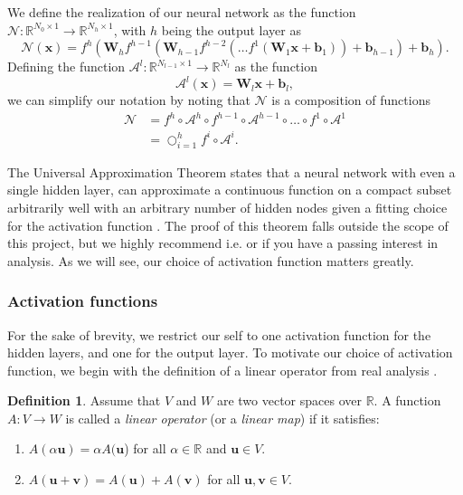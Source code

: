 \documentclass{article}
\theoremstyle{definition}
\newtheorem{definition}{Definition}[subsection]
\begin{document}
We define the realization of our neural network as the function $\mathcal{N}: \mathbb{R}^{N_0 \times 1} \to \mathbb{R}^{N_h \times 1}$, with $h$ being the output layer as
\begin{equation*}
    \mathcal{N}(\boldsymbol{x}) =
    f^h\left(
    \mathbf{W}_h f^{h-1} \left(
    \mathbf{W}_{h-1}f^{h-2} \left(\ldots f^1\left( \mathbf{W}_1 \boldsymbol{x} + \mathbf{b}_1 \right) \right)
    + \mathbf{b}_{h-1} \right) 
    + \mathbf{b}_h \right).
\end{equation*}
Defining the function $\mathcal{A}^l: \mathbb{R}^{N_{l-1} \times 1} \to \mathbb{R}^{N_{l}}$ as the function
\begin{equation*}
    \mathcal{A}^l (\boldsymbol{x}) = \mathbf{W}_l \boldsymbol{x} + \mathbf{b}_l,
\end{equation*}
we can simplify our notation by noting that $\mathcal{N}$ is a composition of functions
\begin{align*}
    \mathcal{N} &= f^h \circ \mathcal{A}^h \circ f^{h-1} \circ \mathcal{A}^{h-1} \circ \ldots \circ f^1 \circ \mathcal{A}^1 \\
    &= \bigcirc_{i = 1}^h f^{i} \circ \mathcal{A}^{i}.
\end{align*}

The Universal Approximation Theorem states that a neural network with even a single hidden layer, can approximate a continuous function on a compact subset arbitrarily well with an arbitrary number of hidden nodes given a fitting choice for the activation function \cite{universalapprox}. The proof of this theorem falls outside the scope of this project, but we highly recommend i.e. \cite{Guliyev2015ASH} or \cite{universalapprox} if you have a passing interest in analysis. As we will see, our choice of activation function matters greatly.

\subsubsection{Activation functions}
For the sake of brevity, we restrict our self to one activation function for the hidden layers, and one for the output layer. To motivate our choice of activation function, we begin with the definition of a linear operator from real analysis \cite[p.~150]{lindstrom2017spaces}.

\begin{definition}
    Assume that $V$ and $W$ are two vector spaces over $\mathbb{R}$. A function $A: V \to W$ is called a \textit{linear operator} (or a \textit{linear map}) if it satisfies:
    \begin{enumerate}[label=(\roman*)]
        \item $A(\alpha\boldsymbol{u}) = \alpha A(\boldsymbol{u}$) for all $\alpha \in \mathbb{R}$ and $\boldsymbol{u} \in V$.

        \item $A(\boldsymbol{u} + \boldsymbol{v}) = A(\boldsymbol{u}) + A(\boldsymbol{v})$ for all $\boldsymbol{u}, \boldsymbol{v} \in V$.
    \end{enumerate}
\end{definition}
\end{document}
